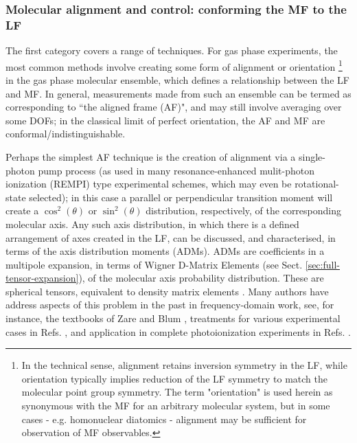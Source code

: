 \documentclass[10pt]{article}
\begin{document}
\subsubsection{Molecular alignment and control: conforming the MF to the LF\label{sec:MF-control}}

The first category covers a range of techniques. For gas phase experiments, the most common methods involve creating some form of alignment or orientation \footnote{In the technical sense, alignment retains 
inversion symmetry in the LF, while orientation typically implies reduction of the LF symmetry to match the molecular point group symmetry. The term "orientation" is used herein as synonymous with the MF for an arbitrary molecular system, but in some cases - e.g. homonuclear diatomics - alignment may be sufficient for observation of MF observables.} 
in the gas phase molecular ensemble, which defines a relationship between the LF and MF. In general, measurements made from such an ensemble can be termed as corresponding to ``the aligned frame (AF)", and may still involve averaging over some DOFs; in the 
classical limit of perfect orientation, the AF and MF are conformal/indistinguishable. 

Perhaps the simplest AF technique is the creation of alignment via a single-photon pump process (as used in many resonance-enhanced mulit-photon ionization (REMPI) type experimental schemes, which may even be rotational-state selected); in this case a parallel or perpendicular transition moment will create a $\cos^2(\theta)$ or $\sin^2(\theta)$ distribution, respectively, of the corresponding molecular axis. Any such axis distribution, in which there is a defined arrangement of axes created in the LF, can be discussed, and characterised, in terms of the axis distribution moments (ADMs). ADMs are coefficients in a multipole expansion, in terms of Wigner D-Matrix Elements (see Sect. \ref{sec:full-tensor-expansion}), of the molecular axis probability distribution. These are spherical tensors, equivalent to density matrix elements \cite{BlumDensityMat}. Many authors have address aspects of this problem in the past in frequency-domain work, see, for instance, the textbooks of Zare \cite{zareAngMom} and Blum \cite{BlumDensityMat}, treatments for various experimental cases in Refs. \cite{Docker1988,Dubs1989,Greene1983}, and application in complete photoionization experiments in Refs. \cite{Leahy1991,hockett2009RotationallyResolvedPhotoelectron}.
\end{document}

